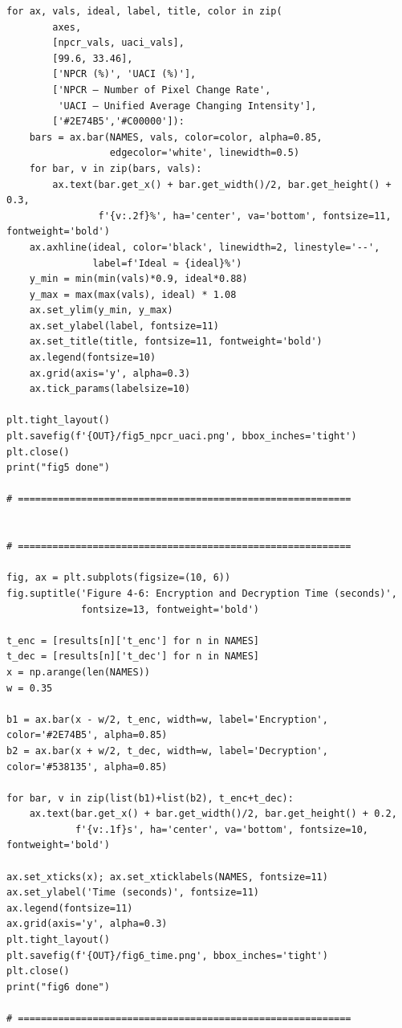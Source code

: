 \begin{verbatim}
for ax, vals, ideal, label, title, color in zip(
        axes,
        [npcr_vals, uaci_vals],
        [99.6, 33.46],
        ['NPCR (%)', 'UACI (%)'],
        ['NPCR — Number of Pixel Change Rate',
         'UACI — Unified Average Changing Intensity'],
        ['#2E74B5','#C00000']):
    bars = ax.bar(NAMES, vals, color=color, alpha=0.85,
                  edgecolor='white', linewidth=0.5)
    for bar, v in zip(bars, vals):
        ax.text(bar.get_x() + bar.get_width()/2, bar.get_height() + 0.3,
                f'{v:.2f}%', ha='center', va='bottom', fontsize=11, fontweight='bold')
    ax.axhline(ideal, color='black', linewidth=2, linestyle='--',
               label=f'Ideal ≈ {ideal}%')
    y_min = min(min(vals)*0.9, ideal*0.88)
    y_max = max(max(vals), ideal) * 1.08
    ax.set_ylim(y_min, y_max)
    ax.set_ylabel(label, fontsize=11)
    ax.set_title(title, fontsize=11, fontweight='bold')
    ax.legend(fontsize=10)
    ax.grid(axis='y', alpha=0.3)
    ax.tick_params(labelsize=10)

plt.tight_layout()
plt.savefig(f'{OUT}/fig5_npcr_uaci.png', bbox_inches='tight')
plt.close()
print("fig5 done")

# ==========================================================


# ==========================================================

fig, ax = plt.subplots(figsize=(10, 6))
fig.suptitle('Figure 4-6: Encryption and Decryption Time (seconds)',
             fontsize=13, fontweight='bold')

t_enc = [results[n]['t_enc'] for n in NAMES]
t_dec = [results[n]['t_dec'] for n in NAMES]
x = np.arange(len(NAMES))
w = 0.35

b1 = ax.bar(x - w/2, t_enc, width=w, label='Encryption', color='#2E74B5', alpha=0.85)
b2 = ax.bar(x + w/2, t_dec, width=w, label='Decryption', color='#538135', alpha=0.85)

for bar, v in zip(list(b1)+list(b2), t_enc+t_dec):
    ax.text(bar.get_x() + bar.get_width()/2, bar.get_height() + 0.2,
            f'{v:.1f}s', ha='center', va='bottom', fontsize=10, fontweight='bold')

ax.set_xticks(x); ax.set_xticklabels(NAMES, fontsize=11)
ax.set_ylabel('Time (seconds)', fontsize=11)
ax.legend(fontsize=11)
ax.grid(axis='y', alpha=0.3)
plt.tight_layout()
plt.savefig(f'{OUT}/fig6_time.png', bbox_inches='tight')
plt.close()
print("fig6 done")

# ==========================================================



\end{verbatim}

